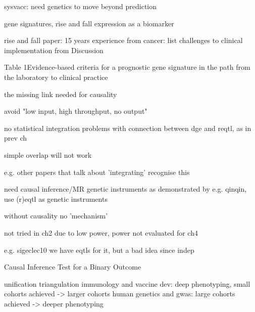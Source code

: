 \begin{outline}
        sysvacc: need genetics to move beyond prediction

        gene signatures, rise and fall
            expression as a biomarker

            rise and fall paper: 15 years experience from cancer: list challenges to clinical implementation from Discussion

            Table 1Evidence-based criteria for a prognostic gene signature in the path from the laboratory to clinical practice

the missing link needed for causality

    avoid "low input, high throughput, no output"

    no statistical integration
        problems with connection between dge and reqtl, as in prev ch

        simple overlap will not work

            e.g. other papers that talk about 'integrating' recognise this

    need causal inference/MR
        genetic instruments
        as demonstrated by e.g. qinqin, use (r)eqtl as genetic instruments

        without causality no 'mechanism'

            not tried in ch2 due to low power, power not evaluated for ch4

        e.g. sigeclec10
        we have eqtls for it, but a bad idea since indep

        Causal Inference Test for a Binary Outcome

unification
    triangulation
    immunology and vaccine dev: deep phenotyping, small cohorts achieved -> larger cohorts
    human genetics and gwas: large cohorts achieved -> deeper phenotyping


\end{outline}
